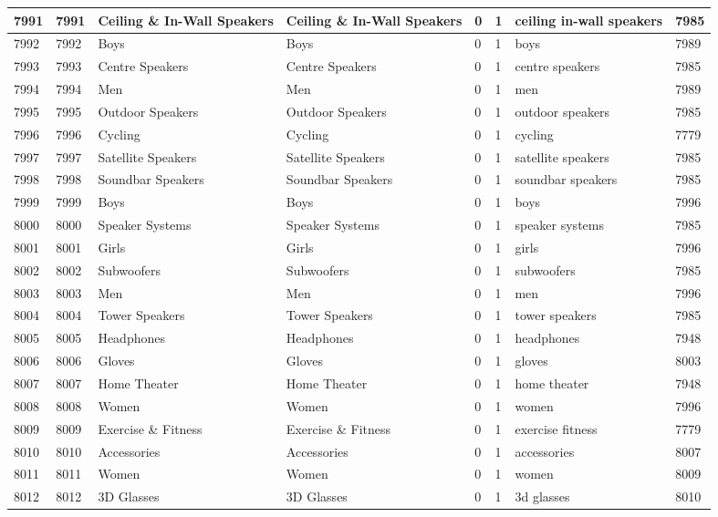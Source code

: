 \begin{longtable}{|l|l|l|l|l|l|l|l|}
7991 & 7991 & Ceiling \& In-Wall Speakers & Ceiling \& In-Wall Speakers & 0 & 1 & ceiling in-wall speakers & 7985 \\ \hline 
7992 & 7992 & Boys & Boys & 0 & 1 & boys & 7989 \\ \hline 
7993 & 7993 & Centre Speakers & Centre Speakers & 0 & 1 & centre speakers & 7985 \\ \hline 
7994 & 7994 & Men & Men & 0 & 1 & men & 7989 \\ \hline 
7995 & 7995 & Outdoor Speakers & Outdoor Speakers & 0 & 1 & outdoor speakers & 7985 \\ \hline 
7996 & 7996 & Cycling & Cycling & 0 & 1 & cycling & 7779 \\ \hline 
7997 & 7997 & Satellite Speakers & Satellite Speakers & 0 & 1 & satellite speakers & 7985 \\ \hline 
7998 & 7998 & Soundbar Speakers & Soundbar Speakers & 0 & 1 & soundbar speakers & 7985 \\ \hline 
7999 & 7999 & Boys & Boys & 0 & 1 & boys & 7996 \\ \hline 
8000 & 8000 & Speaker Systems & Speaker Systems & 0 & 1 & speaker systems & 7985 \\ \hline 
8001 & 8001 & Girls & Girls & 0 & 1 & girls & 7996 \\ \hline 
8002 & 8002 & Subwoofers & Subwoofers & 0 & 1 & subwoofers & 7985 \\ \hline 
8003 & 8003 & Men & Men & 0 & 1 & men & 7996 \\ \hline 
8004 & 8004 & Tower Speakers & Tower Speakers & 0 & 1 & tower speakers & 7985 \\ \hline 
8005 & 8005 & Headphones & Headphones & 0 & 1 & headphones & 7948 \\ \hline 
8006 & 8006 & Gloves & Gloves & 0 & 1 & gloves & 8003 \\ \hline 
8007 & 8007 & Home Theater & Home Theater & 0 & 1 & home theater & 7948 \\ \hline 
8008 & 8008 & Women & Women & 0 & 1 & women & 7996 \\ \hline 
8009 & 8009 & Exercise \& Fitness & Exercise \& Fitness & 0 & 1 & exercise fitness & 7779 \\ \hline 
8010 & 8010 & Accessories & Accessories & 0 & 1 & accessories & 8007 \\ \hline 
8011 & 8011 & Women & Women & 0 & 1 & women & 8009 \\ \hline 
8012 & 8012 & 3D Glasses & 3D Glasses & 0 & 1 & 3d glasses & 8010 \\ \hline 

\end{longtable}
